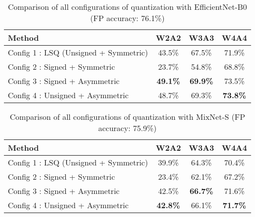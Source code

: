 \documentclass[10pt,twocolumn,letterpaper]{article}
\begin{document}
\begin{table*}[t]
	\caption{Comparison of all configurations of quantization with EfficientNet-B0 (FP accuracy: 76.1\%)}
\centering
	\begin{tabular}{l | c| c | c }
        \toprule
        	{Method} & {W2A2} & {W3A3} & {W4A4} \\
			
			\midrule
	
			Config 1 : LSQ (Unsigned + Symmetric) & 43.5\% & 67.5\% & 71.9\% \\
			Config 2 : Signed + Symmetric & 23.7\% & 54.8\% & 68.8\%  \\
			Config 3 : Signed + Asymmetric & \textbf{49.1\%} & \textbf{69.9\%} & 73.5\%  \\
			Config 4 : Unsigned + Asymmetric & 48.7\% & 69.3\% & \textbf{73.8\%} \\
        \bottomrule
	\end{tabular}
	\label{table:efficientnet}
\end{table*}

\begin{table*}[t]
	\caption{Comparison of all configurations of quantization with MixNet-S (FP accuracy: 75.9\%)}
\centering
	\begin{tabular}{l | c| c | c }
        \toprule
        	{Method} & {W2A2} & {W3A3} & {W4A4} \\
			
			\midrule
	
			Config 1 : LSQ (Unsigned + Symmetric) & 39.9\% & 64.3\% & 70.4\% \\
			Config 2 : Signed + Symmetric & 23.4\% & 62.1\% & 67.2\%  \\
			Config 3 : Signed + Asymmetric & 42.5\% & \textbf{66.7\%} & 71.6\%  \\
			Config 4 : Unsigned + Asymmetric & \textbf{42.8\%} & 66.1\% & \textbf{71.7\%} \\
        \bottomrule
	\end{tabular}
	\label{table:mixnet}
\end{table*}
\end{document}
